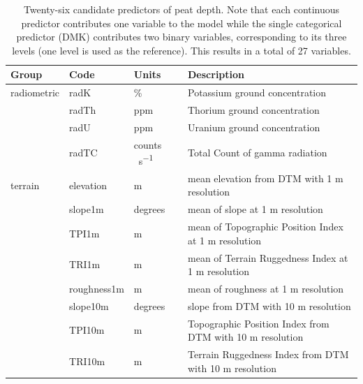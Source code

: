 \documentclass[soil, manuscript]{copernicus}
\begin{document}
\begin{table}[tbp]
\caption{Twenty-six candidate predictors of peat depth. Note that each continuous predictor contributes one variable to the model while the single categorical predictor (DMK) contributes two binary variables, corresponding to its three levels (one level is used as the reference). 
This results in a total of 27 variables.}
\begin{tabular}{llll}
\hline
Group        & Code         & Units                 & Description                                                            \\ \hline
radiometric  & radK         & \%                    & Potassium ground concentration                                         \\ 
             & radTh        & ppm                   & Thorium ground concentration                                           \\
             & radU         & ppm                   & Uranium ground concentration                                           \\
             & radTC        & \unit{counts\,s^{-1}} & Total Count of gamma radiation                                         \\
terrain      & elevation    & m                     & mean elevation from DTM with 1 m resolution                            \\
             & slope1m      & degrees               & mean of slope at 1 m resolution                                        \\
             & TPI1m        & m                     & mean of Topographic Position Index at 1 m resolution                   \\
             & TRI1m        & m                     & mean of Terrain Ruggedness Index at 1 m resolution                     \\
             & roughness1m  & m                     & mean of roughness at 1 m resolution                                    \\
             & slope10m     & degrees               & slope from DTM with 10 m resolution                                    \\
             & TPI10m       & m                     & Topographic Position Index from DTM with 10 m resolution               \\
             & TRI10m       & m                     & Terrain Ruggedness Index from DTM with 10 m resolution                 \\

\end{tabular}
\end{table}
\end{document}
